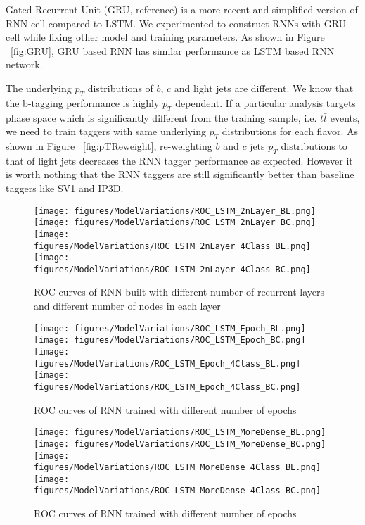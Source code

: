 Gated Recurrent Unit (GRU, reference) is a more recent and simplified version of RNN cell compared to LSTM. We experimented to construct RNNs with GRU cell while fixing other model and training parameters. As shown in Figure ~\ref{fig:GRU}, GRU based RNN has similar performance as LSTM based RNN network. 

The underlying $p_{T}$ distributions of $b$, $c$ and light jets are different. We know that the b-tagging performance is highly $p_{T}$ dependent. If a particular analysis targets phase space which is significantly different from the training sample, i.e. $t\bar t$ events, we need to train taggers with same underlying $p_{T}$ distributions for each flavor. As shown in Figure ~\ref{fig:pTReweight}, re-weighting $b$ and $c$ jets $p_{T}$ distributions to that of light jets decreases the RNN tagger performance as expected. However it is worth nothing that the RNN taggers are still significantly better than baseline taggers like SV1 and IP3D.


\begin{figure}[htbp]
  \centering
 \texttt{[image: figures/ModelVariations/ROC\_LSTM\_2nLayer\_BL.png]}
 \texttt{[image: figures/ModelVariations/ROC\_LSTM\_2nLayer\_BC.png]}
 \texttt{[image: figures/ModelVariations/ROC\_LSTM\_2nLayer\_4Class\_BL.png]}
 \texttt{[image: figures/ModelVariations/ROC\_LSTM\_2nLayer\_4Class\_BC.png]}

\caption{ROC curves of RNN built with different number of recurrent layers and different number of nodes in each layer}
  \label{fig:LayersAndNodes}
\end{figure}

\begin{figure}[htbp]
  \centering
 \texttt{[image: figures/ModelVariations/ROC\_LSTM\_Epoch\_BL.png]}
 \texttt{[image: figures/ModelVariations/ROC\_LSTM\_Epoch\_BC.png]}
 \texttt{[image: figures/ModelVariations/ROC\_LSTM\_Epoch\_4Class\_BL.png]}
 \texttt{[image: figures/ModelVariations/ROC\_LSTM\_Epoch\_4Class\_BC.png]}

\caption{ROC curves of RNN trained with different number of epochs}
  \label{fig:Epochs}
\end{figure}


\begin{figure}[htbp]
  \centering
 \texttt{[image: figures/ModelVariations/ROC\_LSTM\_MoreDense\_BL.png]}
 \texttt{[image: figures/ModelVariations/ROC\_LSTM\_MoreDense\_BC.png]}
 \texttt{[image: figures/ModelVariations/ROC\_LSTM\_MoreDense\_4Class\_BL.png]}
 \texttt{[image: figures/ModelVariations/ROC\_LSTM\_MoreDense\_4Class\_BC.png]}

\caption{ROC curves of RNN trained with different number of epochs}
  \label{fig:MoreDense}
\end{figure}


